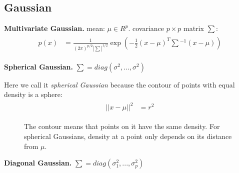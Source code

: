 \subsection{Gaussian}
\textbf{Multivariate Gaussian.}\hspace{0.2cm} mean: $\mu \in R^p$. covariance $p\times p$
matrix $\sum$:
\begin{align}
\begin{split}
	p(x) &= \frac{1}{(2\pi)^{p/2} |\sum|^{1/2}} \exp(-\frac{1}{2} (x-\mu)^T \sum {}^{-1} (x-\mu))
\end{split}
\end{align}


\textbf{Spherical Gaussian.}\hspace{0.2cm} $\sum = diag(\sigma^2, ..., \sigma^2)$

Here we call it \textit{spherical Gaussian} because the contour of points with equal density is a sphere:
\begin{align}
\begin{split}
||x - \mu||^2 &= r^2
\end{split}
\end{align}

\begin{figure}[h]
\caption{The contour means that points on it have the same density. For spherical Gaussians, density at a point only depends on its distance from $\mu$.}
\end{figure}





\textbf{Diagonal Gaussian.}\hspace{0.2cm} $\sum = diag(\sigma_1^2, ..., \sigma_p^2)$

